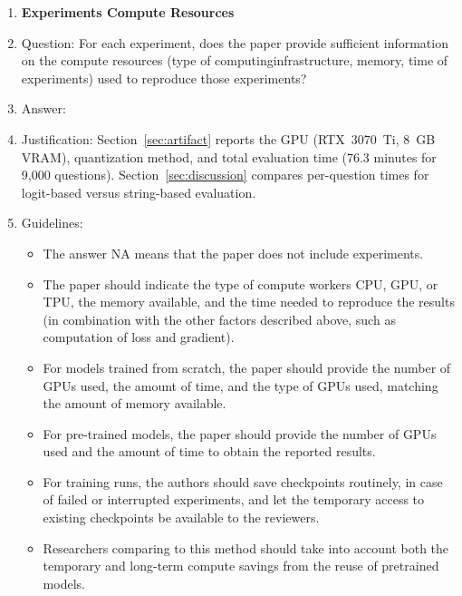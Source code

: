 \begin{enumerate}
\item {\bf Experiments Compute Resources}
\item[] Question: For each experiment, does the paper provide sufficient
information on the compute resources (type of computinginfrastructure,
memory, time of experiments) used to reproduce those experiments?
\item[] Answer: \answerYes{}
\item[] Justification: Section~\ref{sec:artifact} reports the GPU (RTX~3070~Ti,
8~GB VRAM), quantization method, and total evaluation time (76.3 minutes for
9,000 questions). Section~\ref{sec:discussion} compares per-question times for
logit-based versus string-based evaluation.
\item[] Guidelines:
\begin{itemize}
    \item The answer NA means that the paper does not include experiments.
    \item The paper should indicate the type of compute workers CPU, GPU, or TPU,
    the memory available, and the time needed to reproduce the results (in
    combination with the other factors described above, such as
    computation of loss and gradient).
    \item For models trained from scratch, the paper should provide the number of
    GPUs used, the amount of time, and the type of GPUs used, matching the
    amount of memory available.
    \item For pre-trained models, the paper should provide the number of GPUs used
    and the amount of time to obtain the reported results.
    \item For training runs, the authors should save checkpoints routinely, in
    case of failed or interrupted experiments, and let the temporary access
    to existing checkpoints be available to the reviewers.
    \item Researchers comparing to this method should take into account both the
    temporary and long-term compute savings from the reuse of pretrained
    models.
\end{itemize}


\end{enumerate}
